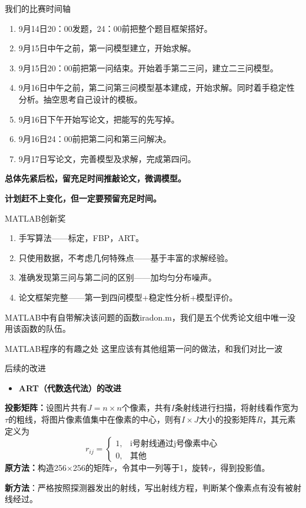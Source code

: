 \documentclass{beamer}
\begin{document}
  \begin{frame}{我们的比赛时间轴}
	\begin{enumerate}
	  \item \small 9月14日20：00发题，24：00前把整个题目框架搭好。
	  \item \small 9月15日中午之前，第一问模型建立，开始求解。
	  \item \small 9月15日20：00前把第一问结束。开始着手第二三问，建立二三问模型。
	  \item \small 9月16日中午之前，第二问第三问模型基本建成，开始求解。同时着手稳定性分析。抽空思考自己设计的模板。
	  \item \small 9月16日下午开始写论文，把能写的先写掉。
	  \item \small 9月16日24：00前把第二问和第三问解决。
	  \item \small 9月17日写论文，完善模型及求解，完成第四问。
	\end{enumerate}
	\begin{center}
	  \textbf{总体先紧后松，留充足时间推敲论文，微调模型。}
	  
	  \textbf{计划赶不上变化，但一定要预留充足时间。}
	\end{center}
  \end{frame}

  \begin{frame}{MATLAB创新奖}
	\begin{enumerate}
	  \item \small 手写算法——标定，FBP，ART。
	  \item \small 只使用数据，不考虑几何特殊点——基于丰富的求解经验。
	  \item \small 准确发现第三问与第二问的区别——加均匀分布噪声。
	  \item \small 论文框架完整——第一到四问模型+稳定性分析+模型评价。
	\end{enumerate}
	\small MATLAB中有自带解决该问题的函数iradon.m，我们是五个优秀论文组中唯一没用该函数的队伍。
	\end{frame}

	\begin{frame}{MATLAB程序的有趣之处}
		这里应该有其他组第一问的做法，和我们对比一波

	\end{frame}

	\begin{frame}{后续的改进}
		\begin{itemize}
			\item \textbf{ART（代数迭代法）的改进}
		\end{itemize}
		\small \textbf{投影矩阵：}设图片共有\(J = n\times n\)个像素，共有$I$条射线进行扫描，将射线看作宽为\(\tau\)的粗线，将图片像素值集中在像素的中心，则有\(I\times J\)大小的投影矩阵$R$，其元素定义为
		\[r_{ij}=
		\begin{cases}
		1 ,& \text{i号射线通过j号像素中心}\\
		0 ,& \text{其他}
		\end{cases}\]
		\textbf{原方法：}构造256$\times$256的矩阵$r$，令其中一列等于1，旋转$r$，得到投影值。

		\textbf{新方法}：严格按照探测器发出的射线，写出射线方程，判断某个像素点有没有被射线经过。
	\end{frame}
\end{document}
